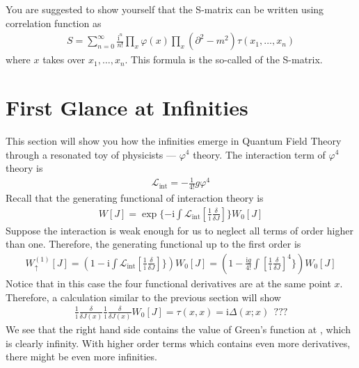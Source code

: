 \documentclass[letterpaper,10pt,english]{sphinxmanual}
\begin{document}
You are suggested to show yourself that the S-matrix can be written using correlation function as
\begin{equation*}
\begin{split}S = \sum_{n=0}^\infty\frac{\mathrm i^n}{n!}\prod_x\varphi(x)\prod_x(\partial^2\!\!-\!m^2)\tau(x_1,\ldots,x_n)\end{split}
\end{equation*}
where \(x\) takes over \(x_1,\ldots,x_n\). This formula is the so-called  of the S-matrix.


\section{First Glance at Infinities}
\label{\detokenize{qft_infty:first-glance-at-infinities}}\label{\detokenize{qft_infty::doc}}
This section will show you how the infinities emerge in Quantum Field Theory through a resonated toy of physicists --- \(\varphi^4\) theory. The interaction term of \(\varphi^4\) theory is
\begin{equation*}
\begin{split}\mathcal{L}_{\text{int}} = -\frac{1}{4!}g\varphi^4\end{split}
\end{equation*}
Recall that the generating functional of interaction theory is
\begin{equation*}
\begin{split}W[J] = \exp\{-\mathrm{i}\int\mathcal{L}_{\text{int}}\!\!\left[\frac{1}{\mathrm{i}}\!\frac{\delta}{\delta J}\right]\} W_0[J]\end{split}
\end{equation*}
Suppose the interaction is weak enough for us to neglect all terms of order higher than one. Therefore, the generating functional up to the first order is
\begin{equation*}
\begin{split}W_\uparrow^{(1)}[J] = (1 - \mathrm{i}\int\mathcal{L}_{\text{int}}\!\!\left[\frac{1}{\mathrm{i}}\!\frac{\delta}{\delta J}\right]\})W_0[J] = (1 - \frac{\mathrm{i}g}{4!}\int\left[\frac{1}{\mathrm{i}}\!\frac{\delta}{\delta J}\right]^4\})W_0[J]\end{split}
\end{equation*}
Notice that in this case the four functional derivatives are at the same point \(x\). Therefore, a calculation similar to the previous section will show
\begin{equation*}
\begin{split}\frac{1}{\mathrm{i}}\!\frac{\delta}{\delta J(x)}\frac{1}{\mathrm{i}}\!\frac{\delta}{\delta J(x)}W_0[J] = \tau(x,x) =  \mathrm i\Delta(x;x)\ \ ???\end{split}
\end{equation*}
We see that the right hand side contains the value of Green's function at , which is clearly infinity. With higher order terms which contains even more derivatives, there might be even more infinities.
\end{document}
